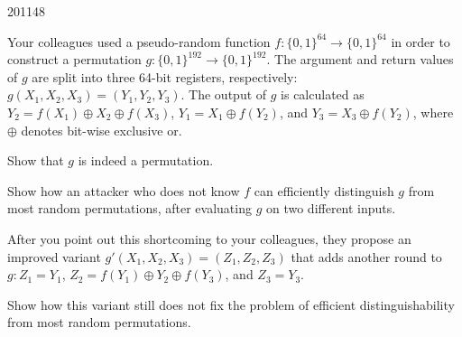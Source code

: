 \documentclass[10pt,\jkfside,a4paper]{article}
\theoremstyle{definition}
\newenvironment{qlist}[1][]{\begin{enumerate}[#1, labelsep=20pt]}{\end{enumerate}}
\newenvironment{question}{\begin{questionbox} \item}{\end{questionbox}}
\begin{document}
\begin{examquestion}{2011}{4}{8}

\begin{qlist}[label=(\textit{\alph*})]

    \setcounter{enumi}{1}

    \begin{question}

        Your colleagues used a pseudo-random function $f: \{0, 1\}^{64} \to \{0, 1\}^{64}$ in order to construct a permutation $g: \{0, 1\}^{192} \to \{0, 1\}^{192}$. The argument and return values of $g$ are split into three 64-bit registers, respectively: $g(X_1, X_2, X_3) = (Y_1, Y_2, Y_3)$. The output of $g$ is calculated as $Y_2 = f(X_1) \oplus X_2 \oplus f(X_3)$, $Y_1 = X_1 \oplus f(Y_2)$, and $Y_3 = X_3 \oplus f(Y_2)$, where $\oplus$ denotes bit-wise exclusive or.

    \end{question}

    \begin{qlist}[label=(\textit{\roman*})]

        \begin{question}

            Show that $g$ is indeed a permutation.

        \end{question}


        \begin{question}

            Show how an attacker who does not know $f$ can efficiently distinguish $g$ from most random permutations, after evaluating $g$ on two different inputs.

        \end{question}


        \begin{question}

            After you point out this shortcoming to your colleagues, they propose an improved variant $g'(X_1, X_2, X_3) = (Z_1, Z_2, Z_3)$ that adds another round to $g: Z_1 = Y_1$, $Z_2 = f(Y_1) \oplus Y_2 \oplus f(Y_3)$, and $Z_3 = Y_3$.

            Show how this variant still does not fix the problem of efficient distinguishability from most random permutations.

        \end{question}


    \end{qlist}

\end{qlist}

\end{examquestion}
\end{document}
